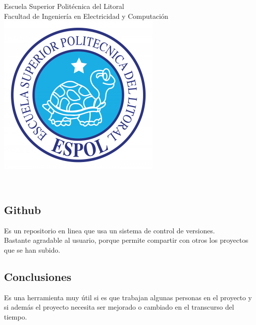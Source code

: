 \documentclass[10pt]{article}
\begin{document}
{\centering
{\Large{Escuela Superior Polit\'ecnica del Litoral\\Facultad de Ingenier\'ia en Electricidad y Computaci\'on\\}}
\vspace{0.6in}
\includegraphics[scale=0.5]{espol.png}\\
\vspace{0.8in}
{\LARGE \textbf{}\\
\vspace{0.5in}

\newpage
\tableofcontents

\newpage
\begin{flushleft}
\section{Github}
Es un repositorio en linea que usa un sistema de control de versiones.\\
Bastante agradable al usuario, porque permite compartir con otros los proyectos que se han subido.\\
\subsection{Conclusiones}
Es una herramienta muy \'util si es que trabajan algunas personas en el proyecto y si adem\'as el proyecto necesita ser mejorado o cambiado en el transcurso del tiempo.\\

\end{flushleft}}}
\end{document}
